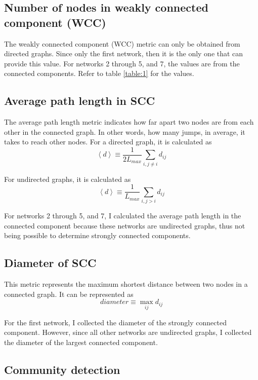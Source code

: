 \subsection{Number of nodes in weakly connected component (WCC)}
The weakly connected component (WCC) metric can only be obtained from directed graphs. Since only the first network, then it is the only one that can provide this value. For networks 2 through 5, and 7, the values are from the connected components. Refer to table \ref{table:1} for the values.

\subsection{Average path length in SCC}
The average path length metric indicates how far apart two nodes are from each other in the connected graph. In other words, how many jumps, in average, it takes to reach other nodes. For a directed graph, it is calculated as
\begin{equation}
    \left\langle d \right\rangle \equiv \frac{1}{2L_{max}}\sum_{i,j \neq i}d_{ij}
    \label{equation:dir_avg_path_len}
\end{equation}

For undirected graphs, it is calculated as
\begin{equation}
    \left\langle d \right\rangle \equiv \frac{1}{L_{max}}\sum_{i,j >  i}d_{ij}
    \label{equation:undir_avg_path_len}
\end{equation}

For networks 2 through 5, and 7, I calculated the average path length in the connected component because these networks are undirected graphs, thus not being possible to determine strongly connected components.

\subsection{Diameter of SCC}
This metric represents the maximum shortest distance between two nodes in a connected graph. It can be represented as
\begin{equation}
    diameter \equiv \max_{ij}d_{ij}
    \label{equation:diameter}
\end{equation}

For the first network, I collected the diameter of the strongly connected component. However, since all other networks are undirected graphs, I collected the diameter of the largest connected component.

\subsection{Community detection}

